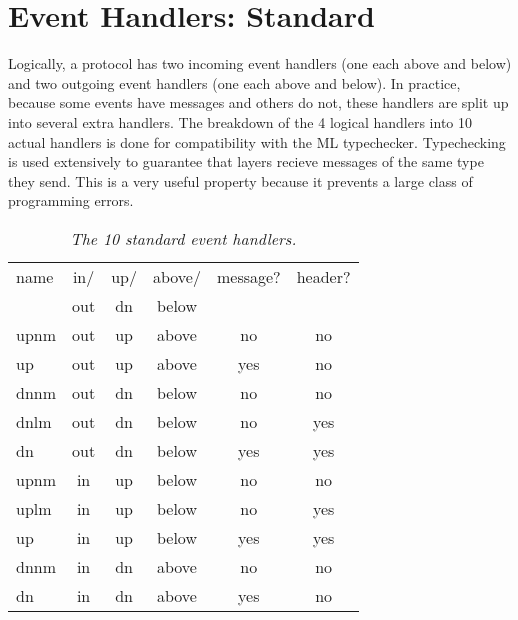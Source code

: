 %
%
%
\section{Event Handlers: Standard}

Logically, a protocol has two incoming event handlers (one each above and
below) and two outgoing event handlers (one each above and below).  In
practice, because some events have messages and others do not, these
handlers are split up into several extra handlers.  The breakdown of the 4
logical handlers into 10 actual handlers is done for compatibility with the
ML typechecker.  Typechecking is used extensively to guarantee that layers
recieve messages of the same type they send.  This is a very useful
property because it prevents a large class of programming errors.

\begin{table}[tb]
\begin{center}
\begin{tabular}{|l|c|c|c|c|c|} \hline
name	& in/	& up/	& above/	& message?	& header? \\
	& out	& dn	& below		&		& 	\\ \hline \hline
upnm	& out 	& up	& above		& no		& no	\\ \hline
up	& out	& up	& above		& yes		& no	\\ \hline
dnnm	& out	& dn	& below		& no		& no	\\ \hline
dnlm	& out	& dn	& below 	& no		& yes	\\ \hline
dn	& out	& dn	& below		& yes		& yes	\\ \hline \hline
upnm	& in 	& up	& below		& no		& no	\\ \hline
uplm	& in	& up	& below		& no		& yes	\\ \hline
up	& in	& up	& below		& yes		& yes	\\ \hline
dnnm	& in 	& dn 	& above		& no		& no	\\ \hline
dn	& in	& dn	& above		& yes		& no	\\ \hline
\end{tabular}
\end{center}
\caption{\em The 10 standard event handlers.}
\label{table:handlers}
\end{table}

